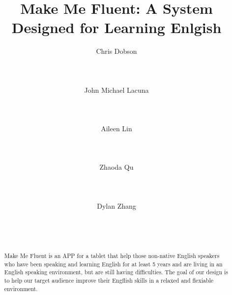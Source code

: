 \documentclass{sigchi}
\begin{document}
\title{Make Me Fluent: A System Designed for Learning Enlgish }

\author{
  \alignauthor Chris Dobson\\
    \\
    \\
    \\
  \alignauthor John Michael Lacuna\\
    \\
    \\
    \\
  \alignauthor Aileen Lin\\
    \\
    \\
    \\
  \alignauthor Zhaoda Qu\\
    \\
    \\
    \\
  \alignauthor Dylan Zhang\\
    \\
    \\
    \\  
}

\maketitle

\begin{abstract}
Make Me Fluent is an APP for a tablet that help those non-native English speakers who
have been speaking and learning English for at least 5 years and are living in an 
English speaking environment, but are still having difficulties. The goal of our 
design is to help our target audience improve their Engflish skills in a relaxed 
and flexiable environment.
\end{abstract}

\end{document}
